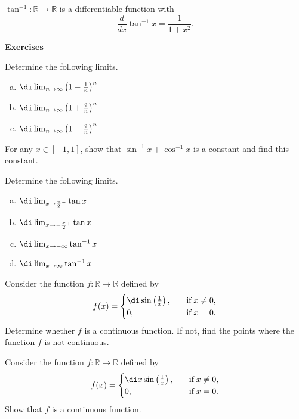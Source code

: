 \begin{theorem}{}
$\tan^{-1}:\mathbb{R}\to \mathbb{R}$ is a differentiable function with
\[\frac{d}{dx}\tan^{-1}x=\frac{1}{1+x^2}.\]
\end{theorem}
\vp


\noindent
{\bf \large Exercises  \thesection}
\setcounter{myquestion}{1}
\begin{question}{\themyquestion}
Determine the following limits.
\begin{enumerate}[(a)]
\item
$\di\lim_{n\to \infty}\left(1-\frac{1}{n}\right)^n$
\item
$\di\lim_{n\to \infty}\left(1+\frac{2}{n}\right)^n$
\item
$\di\lim_{n\to \infty}\left(1-\frac{2}{n}\right)^n$
 
\end{enumerate}
\end{question}
\atc
 
 
\begin{question}{\themyquestion}
For any $x\in [-1,1]$, show that $\sin^{-1}x+\cos^{-1}x$ is a constant and find this constant.
\end{question}
\atc
\begin{question}{\themyquestion}
Determine the following limits.
\begin{enumerate}[(a)]
\item
$\di\lim_{x\to \frac{\pi}{2}^-}\tan x$
\item
$\di\lim_{x\to -\frac{\pi}{2}^+}\tan x$
\item
$\di\lim_{x\to -\infty}\tan^{-1} x$
\item
$\di\lim_{x\to \infty}\tan^{-1} x$
\end{enumerate}
\end{question}

\atc
 
 
\begin{question}{\themyquestion}
Consider the function $f:\mathbb{R}\to\mathbb{R}$ defined by
\[f(x)=\begin{cases} \di \sin\left(\frac{1}{x}\right),\quad &\text{if}\;x\neq 0,\\
0,\quad &\text{if}\;x= 0.\end{cases}\]
Determine whether $f$ is a continuous function. If not, find the points where the function $f$ is not continuous.
\end{question}

\atc
 
 
\begin{question}{\themyquestion}
Consider the function $f:\mathbb{R}\to\mathbb{R}$ defined by
\[f(x)=\begin{cases} \di x\sin\left(\frac{1}{x}\right),\quad &\text{if}\;x\neq 0,\\
0,\quad &\text{if}\;x= 0.\end{cases}\]
Show that $f$ is a continuous function.
\end{question}

